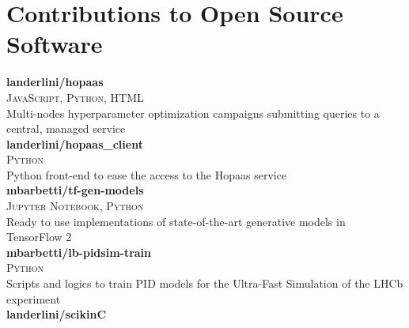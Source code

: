 \newcommand{\pkgname}[1]
  {\normalsize \color{hlcolor-0} \textbf{#1}}

\newcommand{\pkginfo}[1]
  {\small \color{hlcolor-1} \textsc{#1}}
  
\newcommand{\pkgdesc}[1]
  {\normalsize \color{maincolor} {#1}}


\section*{Contributions to Open Source Software}
\begin{cvcontent}
  \pkgname{landerlini/hopaas}
  \\ [0.5mm]
  \pkginfo{JavaScript, Python, HTML}
  \\ [0.5mm]
  \pkgdesc{Multi-nodes hyperparameter optimization campaigns submitting queries to a central, managed service}
  \\ [4mm]
  \pkgname{landerlini/hopaas\_client}
  \\ [0.5mm]
  \pkginfo{Python}
  \\ [0.5mm]
  \pkgdesc{Python front-end to ease the access to the Hopaas service}
  \\ [4mm]
  \pkgname{mbarbetti/tf-gen-models}
  \\ [0.5mm]
  \pkginfo{Jupyter Notebook, Python}
  \\ [0.5mm]
  \pkgdesc{Ready to use implementations of state-of-the-art generative models in TensorFlow 2}
  \\ [4mm]
  \pkgname{mbarbetti/lb-pidsim-train}
  \\ [0.5mm]
  \pkginfo{Python}
  \\ [0.5mm]
  \pkgdesc{Scripts and logics to train PID models for the Ultra-Fast Simulation of the LHCb experiment}
  \\ [4mm]
  \pkgname{landerlini/scikinC}

\end{cvcontent}
